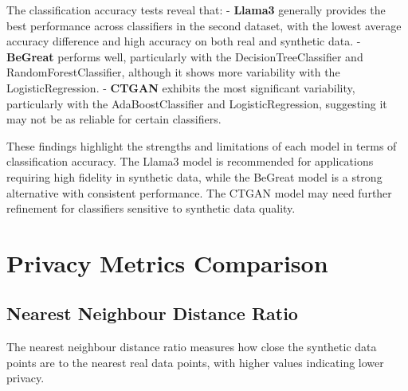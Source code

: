 \vspace{0.5cm}

The classification accuracy tests reveal that:
- \textbf{Llama3} generally provides the best performance across classifiers in the second dataset, with the lowest average accuracy difference and high accuracy on both real and synthetic data.
- \textbf{BeGreat} performs well, particularly with the DecisionTreeClassifier and RandomForestClassifier, although it shows more variability with the LogisticRegression.
- \textbf{CTGAN} exhibits the most significant variability, particularly with the AdaBoostClassifier and LogisticRegression, suggesting it may not be as reliable for certain classifiers.

\vspace{0.5cm}

These findings highlight the strengths and limitations of each model in terms of classification accuracy. The Llama3 model is recommended for applications requiring high fidelity in synthetic data, while the BeGreat model is a strong alternative with consistent performance. The CTGAN model may need further refinement for classifiers sensitive to synthetic data quality.







\section{Privacy Metrics Comparison}

\subsection{Nearest Neighbour Distance Ratio}

The nearest neighbour distance ratio measures how close the synthetic data points are to the nearest real data points, with higher values indicating lower privacy.

